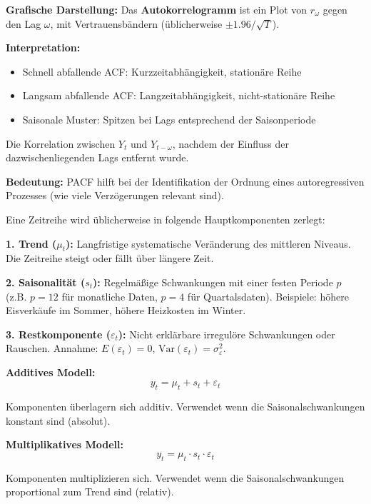\textbf{Grafische Darstellung:} Das \textbf{Autokorrelogramm} ist ein Plot von $r_\omega$ gegen den Lag $\omega$, mit Vertrauensbändern (üblicherweise $\pm 1.96 / \sqrt{T}$).

\textbf{Interpretation:}
\begin{itemize}[leftmargin=1.5em]
    \item Schnell abfallende ACF: Kurzzeitabhängigkeit, stationäre Reihe
    \item Langsam abfallende ACF: Langzeitabhängigkeit, nicht-stationäre Reihe
    \item Saisonale Muster: Spitzen bei Lags entsprechend der Saisonperiode
\end{itemize}

Die Korrelation zwischen $Y_t$ und $Y_{t-\omega}$, nachdem der Einfluss der dazwischenliegenden Lags entfernt wurde.

\textbf{Bedeutung:} PACF hilft bei der Identifikation der Ordnung eines autoregressiven Prozesses (wie viele Verzögerungen relevant sind).

Eine Zeitreihe wird üblicherweise in folgende Hauptkomponenten zerlegt:

\textbf{1. Trend ($\mu_t$):}
Langfristige systematische Veränderung des mittleren Niveaus. Die Zeitreihe steigt oder fällt über längere Zeit.

\textbf{2. Saisonalität ($s_t$):}
Regelmäßige Schwankungen mit einer festen Periode $p$ (z.B. $p = 12$ für monatliche Daten, $p = 4$ für Quartalsdaten). Beispiele: höhere Eisverkäufe im Sommer, höhere Heizkosten im Winter.

\textbf{3. Restkomponente ($\varepsilon_t$):}
Nicht erklärbare irregulöre Schwankungen oder Rauschen. Annahme: $E(\varepsilon_t) = 0$, $\text{Var}(\varepsilon_t) = \sigma_\varepsilon^2$.


\textbf{Additives Modell:}
$$y_t = \mu_t + s_t + \varepsilon_t$$

Komponenten überlagern sich additiv. Verwendet wenn die Saisonalschwankungen konstant sind (absolut).

\textbf{Multiplikatives Modell:}
$$y_t = \mu_t \cdot s_t \cdot \varepsilon_t$$

Komponenten multiplizieren sich. Verwendet wenn die Saisonalschwankungen proportional zum Trend sind (relativ).

